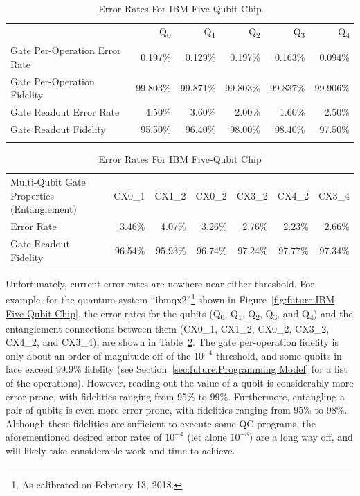 \begin{table}[tbh]
\renewcommand*{\arraystretch}{1.1}
\small
\centering\OneColumnHSpace{-0.1in}
\begin{tabular}{lrrrrr}
	\toprule
	& Q\textsubscript{0} &
		Q\textsubscript{1} &
			Q\textsubscript{2} &
				Q\textsubscript{3} &
					Q\textsubscript{4} \\
	Gate Per-Operation Error Rate &
	   0.197\% &
	  	 0.129\% &
			 0.197\% &
				 0.163\% &
					 0.094\% \\
	Gate Per-Operation Fidelity &
	  99.803\% &
	  	99.871\% &
			99.803\% &
				99.837\% &
					99.906\% \\
	Gate Readout Error Rate &
	   4.50\% &
	  	 3.60\% &
			 2.00\% &
				 1.60\% &
					 2.50\% \\
	Gate Readout Fidelity &
	  95.50\% &
	  	96.40\% &
			98.00\% &
				98.40\% &
					97.50\% \\
	& & & & & \\
\end{tabular}
\begin{tabular}{lrrrrrr}
	Multi-Qubit Gate Properties (Entanglement) &
		CX0\_1 &
			CX1\_2 &
				CX0\_2 &
					CX3\_2 &
						CX4\_2 &
							CX3\_4 \\
	Error Rate &
		   3.46\% &
			 4.07\% &
				 3.26\% &
					 2.76\% &
						 2.23\% &
						 	2.66\% \\
	Gate Readout Fidelity &
	  96.54\% &
	  	95.93\% &
			96.74\% &
				97.24\% &
					97.77\% &
						97.34\% \\
	\bottomrule
\end{tabular}
\caption{Error Rates For IBM Five-Qubit Chip}
\label{tab:future:Error Rates For IBM Five-Qubit Chip}
\end{table}

Unfortunately, current error rates are nowhere near either threshold.
For example, for the quantum system ``ibmqx2''\footnote{
	As calibrated on February 13, 2018.}
shown in
Figure~\ref{fig:future:IBM Five-Qubit Chip},
the error rates for the qubits
(Q\textsubscript{0}, 
Q\textsubscript{1}, 
Q\textsubscript{2}, 
Q\textsubscript{3}, and
Q\textsubscript{4})
and the entanglement connections between them
(CX0\_1,
CX1\_2,
CX0\_2,
CX3\_2,
CX4\_2, and
CX3\_4),
are shown in
Table~\ref{tab:future:Error Rates For IBM Five-Qubit Chip}.
The gate per-operation fidelity is only about an order of magnitude
off of the $10^{-4}$ threshold, and some qubits in face exceed 99.9\%
fidelity (see Section~\ref{sec:future:Programming Model} for a list of
the operations).
However, reading out the value of a qubit is considerably more
error-prone, with fidelities ranging from 95\% to 99\%.
Furthermore, entangling a pair of qubits is even more error-prone,
with fidelities ranging from 95\% to 98\%.
Although these fidelities are sufficient to execute some QC programs, the
aforementioned desired error rates of $10^{-4}$ (let alone $10^{-8}$) are a
long way off, and will likely take considerable work and time to achieve.

